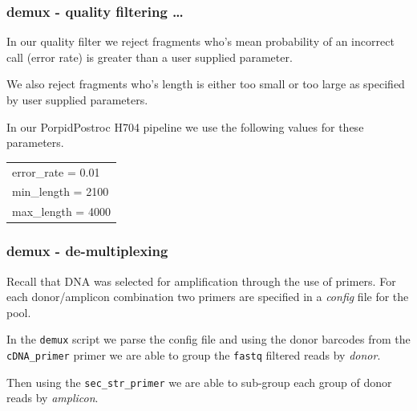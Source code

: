 \documentclass{beamer}
\newcommand{\pdfnarration}[1]{%
\onslide*<\value{beamerpauses}>{\pdfmargincomment[style=note,author=narration]{#1}}%
}
\renewcommand{\pdfnarration}[1]{}
\begin{document}
\begin{frame}
\frametitle{ demux - quality filtering \ldots  }

\alert<1> 

In our quality filter we reject fragments who's
mean probability of an incorrect call (error rate) is greater than a user supplied parameter. 

\bigskip
We also reject fragments who's length is either too small or too large 
as specified by user supplied parameters.

\bigskip
In our PorpidPostroc H704 pipeline we use the following values for these parameters.

\bigskip
\begin{tabular}{l}
	error\_rate = 0.01 \\
        min\_length = 2100 \\
        max\_length = 4000 \\
 \end{tabular}


\pdfnarration{ 
[[sinc 1000]]
The error rate of a fragment is the mean probability of an incorrect call.
[[sinc 1000]]
In our quality filter we reject fragments who's
error rate is greater than a user supplied parameter. 
[[sinc 1000]]
We also reject fragments who's length is either too small or too large 
as specified by user supplied parameters.
[[sinc 1000]]
In our PorpidPostroc, H 704, pipeline we use the values shown for these parameters.
[[sinc 1000]]
}

\end{frame}

\begin{frame}[fragile]
\frametitle{ demux - de-multiplexing }

\alert<1> 

Recall that DNA was selected for amplification through the use of primers. For each donor/amplicon combination
two primers are specified in a {\em config} file for the pool. 

\bigskip
In the {\tt demux} script we parse the config file and using the donor barcodes from the {\tt cDNA\_primer} primer we
are able to group the {\tt fastq} filtered reads by {\em donor}.

\bigskip
Then using the {\tt sec\_str\_primer} we are able to sub-group each group of donor reads by {\em amplicon}.

\pdfnarration{ 
[[sinc 1000]]
Samples are often tagged and pooled for one sequencing run.
[[sinc 1000]]
This is called multiplexing, and after the run the sequences generated must be de-multiplexed.
[[sinc 1000]]
Two primers are used for specifying one sample in a pool of samples
[[sinc 1000]]
 A pre-defined barcode of length 6 base pairs is used to identify the donor.
[[sinc 1000]]
A second primer identifies the amplicon.
[[sinc 1000]]
}

\end{frame}
\end{document}

